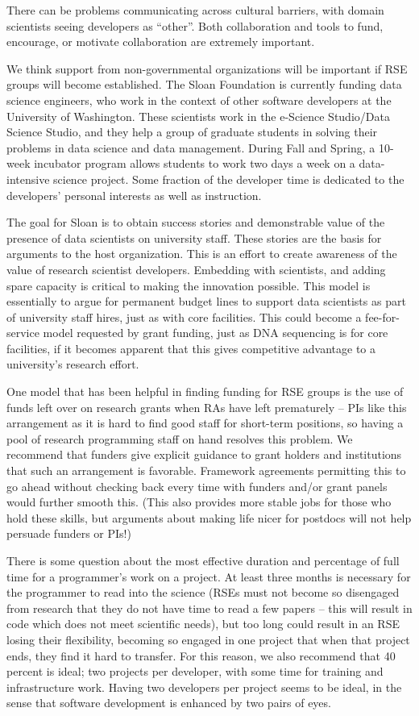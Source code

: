 There can be problems communicating across cultural barriers, with domain
scientists seeing developers as ``other''. Both collaboration and tools to fund,
encourage, or motivate collaboration are extremely important. 

We think support from non-governmental organizations will be important if RSE
groups will become established. The Sloan Foundation is currently funding data
science engineers, who work in the context of other software developers at the
University of Washington. These scientists work in the e-Science Studio/Data
Science Studio, and they help a group of graduate students in solving their
problems in data science and data management. During Fall and Spring, a 10-week
incubator program allows students to work two days a week on a data-intensive
science project. Some fraction of the developer time is dedicated to the
developers' personal interests as well as instruction.

The goal for Sloan is to obtain success stories and demonstrable value
of the presence of data scientists on university staff. These stories are the
basis for arguments to the host organization. This is an effort to create
awareness of the value of research scientist developers. Embedding with
scientists, and adding spare capacity is critical to making the innovation
possible. This model is essentially to argue for permanent budget lines to
support data scientists as part of university staff hires, just as with core
facilities. This could become a fee-for-service model requested by grant
funding, just as DNA sequencing is for core facilities, if it becomes apparent
that this gives competitive advantage to a university's research effort.

One model that has been helpful in finding funding for RSE groups is the use of
funds left over on research grants when RAs have left prematurely -- PIs like
this arrangement as it is hard to find good staff for short-term positions, so
having a pool of research programming staff on hand resolves this problem. We
recommend that funders give explicit guidance to grant holders and institutions
that such an arrangement is favorable. Framework agreements permitting this to go
ahead without checking back every time with funders and/or grant panels would
further smooth this. (This also provides more stable jobs for those who hold
these skills, but arguments about making life nicer for postdocs will not help
persuade funders or PIs!)

There is some question about the most effective duration and percentage of full
time for a programmer's work on a project. At least three months is necessary
for the programmer to read into the science (RSEs must not become so disengaged
from research that they do not have time to read a few papers -- this will result
in code which does not meet scientific needs), but too long could result in an
RSE losing their flexibility, becoming so engaged in one project that when that
project ends, they find it hard to transfer. For this reason, we also recommend
that 40 percent is ideal; two projects per developer, with some time for
training and infrastructure work. Having two developers per project seems to be ideal,
in the sense that software development is enhanced by two pairs of eyes.

